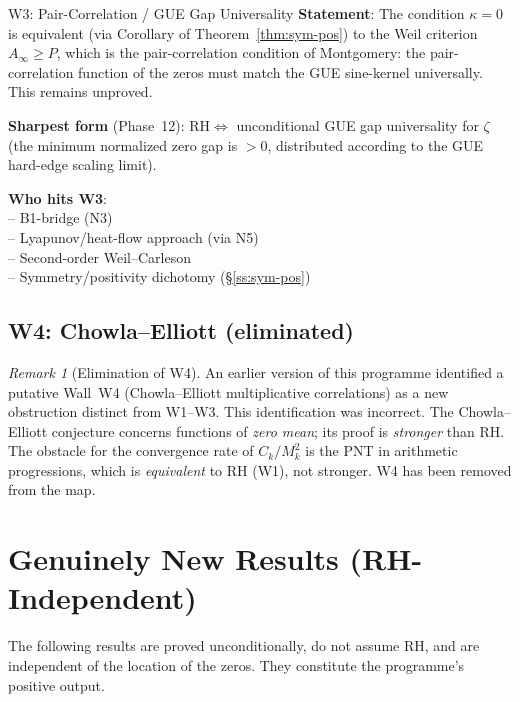 \documentclass[11pt]{amsart}
\theoremstyle{definition}
\theoremstyle{remark}
\newtheorem{remark}[theorem]{Remark}
\newcommand{\RH}{\mathrm{RH}}
\newcommand{\kap}{\kappa}
\begin{document}
\begin{wallbox}{W3: Pair-Correlation / GUE Gap Universality}
\textbf{Statement}: The condition $\kap=0$ is equivalent (via Corollary of
Theorem~\ref{thm:sym-pos}) to the Weil criterion $A_\infty \ge P$, which is the
pair-correlation condition of Montgomery: the pair-correlation function of the zeros
must match the GUE sine-kernel universally.  This remains unproved.

\textbf{Sharpest form} (Phase~12): $\RH \Longleftrightarrow$ unconditional GUE gap
universality for $\zeta$ (the minimum normalized zero gap is $>0$, distributed
according to the GUE hard-edge scaling limit).

\textbf{Who hits W3}: \\
-- B1-bridge (N3) \\
-- Lyapunov/heat-flow approach (via N5) \\
-- Second-order Weil--Carleson \\
-- Symmetry/positivity dichotomy (\S\ref{ss:sym-pos})
\end{wallbox}

\subsection{W4: Chowla--Elliott (eliminated)}

\begin{remark}[Elimination of W4]
An earlier version of this programme identified a putative Wall~W4 (Chowla--Elliott
multiplicative correlations) as a new obstruction distinct from W1--W3.  This
identification was incorrect.  The Chowla--Elliott conjecture concerns functions of
\emph{zero mean}; its proof is \emph{stronger} than RH.  The obstacle for the
convergence rate of $C_k/M_k^2$ is the PNT in arithmetic progressions, which is
\emph{equivalent} to RH (W1), not stronger.  W4 has been removed from the map.
\end{remark}

\section{Genuinely New Results (RH-Independent)}
\label{sec:new}

The following results are proved unconditionally, do not assume RH, and are
independent of the location of the zeros.  They constitute the programme's positive
output.
\end{document}
